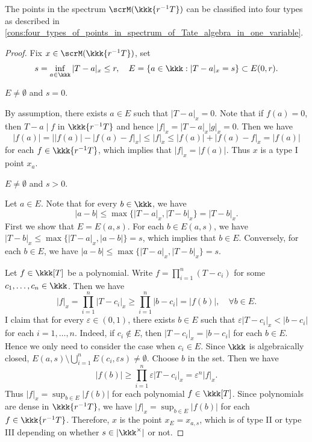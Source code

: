 \begin{proposition}\label{prop:four_types_of_points_in_spectrum_of_Tate_algebra_in_one_variable}
	The points in the spectrum \(\scrM(\kkk\{r^{-1}T\})\) can be classified into four types as described in \cref{cons:four_types_of_points_in_spectrum_of_Tate_algebra_in_one_variable}.
\end{proposition}
\begin{proof}
	Fix \(x \in \scrM(\kkk\{r^{-1}T\})\), set
	\[ s = \inf_{a \in \kkk} |T - a|_x \leq r,\quad  E = \{a \in \kkk : |T - a|_x = s\} \subset E(0,r). \]

	\begin{case}\label{case_in_proof_of_four_type_points:point_type_I}
		\(E \neq \emptyset\) and \(s=0\).
	\end{case}
	By assumption, there exists \(a \in E\) such that \(|T - a|_x = 0\).
	Note that if \(f(a) = 0\), then \(T-a \mid f\) in \(\kkk\{r^{-1}T\}\) and hence \(|f|_x = |T - a|_x|g|_x = 0\).
	Then we have
	\[ |f(a)| = \big| |f(a)| - |f(a) - f|_x \big| \leq |f|_x \leq |f(a)| + |f(a) - f|_x = |f(a)| \]
	for each \(f \in \kkk\{r^{-1}T\}\), which implies that \(|f|_x = |f(a)|\).
	Thus \(x\) is a type I point \(x_a\).

	\begin{case}\label{case_in_proof_of_four_type_points:point_type_II_and_III}
		\(E \neq \emptyset\) and \(s > 0\).
	\end{case}
	Let \(a \in E\).
	Note that for every \(b \in \kkk\), we have
	\[ |a-b| \leq \max\{|T - a|_x, |T - b|_x\} = |T - b|_x. \]
	First we show that \(E = E(a,s)\).
	For each \(b \in E(a,s)\), we have \(|T - b|_x \leq \max\{|T - a|_x, |a - b|\} = s\), which implies that \(b \in E\).
	Conversely, for each \(b \in E\), we have \(|a - b| \leq \max\{|T - a|_x, |T - b|_x\} = s\).

	Let \(f \in \kkk[T]\) be a polynomial.
	Write \(f = \prod_{i=1}^n (T - c_i)\) for some \(c_1, \ldots, c_n \in \kkk\).
	Then we have
	\[ |f|_x = \prod_{i=1}^n |T - c_i|_x \geq \prod_{i=1}^n |b - c_i| = |f(b)|, \quad \forall b \in E. \]
	I claim that for every \(\varepsilon \in (0,1)\), there exists \(b \in E\) such that \(\varepsilon |T-c_i|_x < |b - c_i|\) for each \(i = 1, \ldots, n\).
	Indeed, if \(c_i \notin E\), then \(|T-c_i|_x = |b - c_i|\) for each \(b \in E\).
	Hence we only need to consider the case when \(c_i \in E\).
	Since \(\kkk\) is algebraically closed, \(E(a,s) \setminus \bigcup_{i=1}^n E(c_i,\varepsilon s) \neq \emptyset\).
	Choose \(b\) in the set.
	Then we have
	\[ |f(b)| \geq \prod_{i=1}^n \varepsilon |T - c_i|_x = \varepsilon^n |f|_x. \]
	Thus \(|f|_x = \sup_{b \in E} |f(b)|\) for each polynomial \(f \in \kkk[T]\).
	Since polynomials are dense in \(\kkk\{r^{-1}T\}\), we have \(|f|_x = \sup_{b \in E} |f(b)|\) for each \(f \in \kkk\{r^{-1}T\}\).
	Therefore, \(x\) is the point \(x_E = x_{a,s}\), which is of type II or type III depending on whether \(s \in |\kkk^\times|\) or not.


\end{proof}
